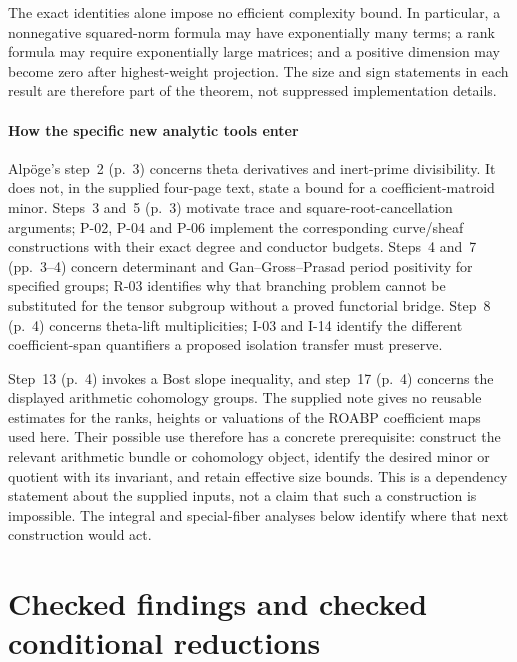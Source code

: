 \documentclass[11pt,a4paper]{article}
\theoremstyle{definition}\newtheorem{definition}{Definition}
\begin{document}
The exact identities alone impose no efficient complexity bound. In particular, a nonnegative squared-norm formula may have exponentially many terms; a rank formula may require exponentially large matrices; and a positive dimension may become zero after highest-weight projection. The size and sign statements in each result are therefore part of the theorem, not suppressed implementation details.

\subsection{How the specific new analytic tools enter}

Alp\"oge's step~2 (p.~3) concerns theta derivatives and inert-prime divisibility. It does not, in the supplied four-page text, state a bound for a coefficient-matroid minor. Steps~3 and~5 (p.~3) motivate trace and square-root-cancellation arguments; P-02, P-04 and P-06 implement the corresponding curve/sheaf constructions with their exact degree and conductor budgets. Steps~4 and~7 (pp.~3--4) concern determinant and Gan--Gross--Prasad period positivity for specified groups; R-03 identifies why that branching problem cannot be substituted for the tensor subgroup without a proved functorial bridge. Step~8 (p.~4) concerns theta-lift multiplicities; I-03 and I-14 identify the different coefficient-span quantifiers a proposed isolation transfer must preserve.

Step~13 (p.~4) invokes a Bost slope inequality, and step~17 (p.~4) concerns the displayed arithmetic cohomology groups. The supplied note gives no reusable estimates for the ranks, heights or valuations of the ROABP coefficient maps used here. Their possible use therefore has a concrete prerequisite: construct the relevant arithmetic bundle or cohomology object, identify the desired minor or quotient with its invariant, and retain effective size bounds. This is a dependency statement about the supplied inputs, not a claim that such a construction is impossible. The integral and special-fiber analyses below identify where that next construction would act.

\part{Checked findings and checked conditional reductions}

\end{document}
